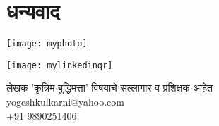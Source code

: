\chapter*{धन्यवाद }

\begin{minipage}[T]{0.5\textwidth}
    \centering
    \texttt{[image: myphoto]}
\end{minipage}%
\begin{minipage}[T]{0.5\textwidth}
	\centering
    \texttt{[image: mylinkedinqr]}
	
	लेखक 'कृत्रिम बुद्धिमत्ता' विषयाचे सल्लागार व प्रशिक्षक आहेत \\
	yogeshkulkarni@yahoo.com \\
	+91 9890251406
\end{minipage}
  

